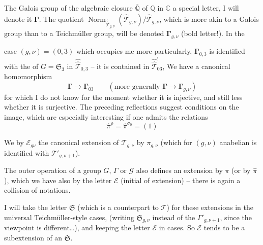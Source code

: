 The Galois group  of the algebraic closure $\overline{\mathbb Q}$ of $\mathbb Q$ in $\mathbb C$   a special letter, I will denote it $\boldsymbol{\Gamma}$. The quotient  $\operatorname{Norm}_{\widehat{\widehat{\mathcal T}}_{g,\nu}}(\widehat{\mathcal T}_{g,\nu})/\widehat{\mathcal T}_{g,\nu}$, which is more akin to a Galois group than to a Teichmüller group, will be denoted $\boldsymbol{\Gamma}_{g,\nu}$ (bold letter!). In the



case $(g,\nu)=(0,3)$ which occupies me more particularly, $\boldsymbol{\Gamma}_{0,3}$ is identified with the   of $G=\mathfrak S_3$  in $\widehat{\widehat{\mathcal T}}_{0,3}$ -- it is contained in $\widehat{\widehat{\mathcal T}}_{03}^{!}$,  We have a canonical homomorphism
\[
\boldsymbol{\Gamma}\longrightarrow\boldsymbol{\Gamma}_{03}
\qquad (\text{more generally }\boldsymbol{\Gamma}\longrightarrow\boldsymbol{\Gamma}_{g,\nu})
\]
for which I do not know for the moment whether it is injective, and still less whether it is surjective. The preceding reflections suggest conditions on the image, which are especially interesting if one admits the relations
\[
\widehat{\pi}^{\rho}=\widehat{\pi}^{\sigma_0}=(1)
\]

We   by $\mathcal E_{g\nu}$ the canonical extension of $\mathcal T_{g,\nu}$ by $\pi_{g,\nu}$ (which for $(g,\nu)$ anabelian is identified with $\mathcal T'_{g,\nu+1}$).

The outer operation of a group $G$, $\Gamma$ or $\mathcal G$ also defines an extension by $\pi$ (or by $\widehat{\pi}$), which we have also  by the letter $\mathcal E$ (initial of extension) -- there is again a collision of notations.



I will take the letter $\mathfrak{S}$ (which is a counterpart to $\mathcal{T}$) for these extensions in the universal Teichmüller-style cases, (writing $\mathfrak{S}_{g,\nu}$ instead of the $\Gamma'_{g,\nu+1}$, since the viewpoint is different\ldots), and keeping the letter $\mathcal{E}$ in   cases. So $\mathcal{E}$ tends to be a subextension of an $\mathfrak{S}$.

